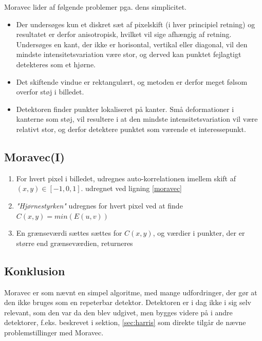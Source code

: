 Moravec lider af følgende problemer pga. dens simplicitet. 
\begin{itemize}
\item{Der undersøges kun et diskret sæt af pixelskift (i hver principiel retning) og resultatet er derfor anisotropisk, hvilket vil sige afhængig af retning. Undersøges en kant, der ikke er horisontal, vertikal eller diagonal, vil den mindste intensitetsvariation være stor, og derved kan punktet fejlagtigt detekteres som et hjørne.}
\item{Det skiftende vindue er rektangulært, og metoden er derfor meget følsom overfor støj i billedet.}
\item{Detektoren finder punkter lokaliseret på kanter. Små deformationer i kanterne som støj, vil resultere i at den mindste intensitetsvariation vil være relativt stor, og derfor detektere punktet som værende et interessepunkt.}
\end{itemize}
\subsection*{Moravec(I)}
\begin{enumerate}
\item{For hvert pixel i billedet, udregnes auto-korrelationen imellem skift af $(x,y) \in [-1,0,1]$. udregnet ved ligning \ref{moravec}}
\item{\textit{"Hjørnestyrken"} udregnes for hvert pixel ved at finde $C(x,y)=min(E(u,v))$}
\item{En grænseværdi sættes sættes for $C(x,y)$, og værdier i punkter, der er større end grænseværdien, returneres}
\end{enumerate}
\subsection*{Konklusion}
Moravec er som nævnt en simpel algoritme, med mange udfordringer, der gør at den ikke bruges som en repeterbar detektor. Detektoren er i dag ikke i sig selv relevant, som den var da den blev udgivet, men bygges videre på i andre detektorer, f.eks. \cite{Harris} beskrevet i sektion, \ref{sec:harris} som direkte tilgår de nævne problemstillinger med Moravec.